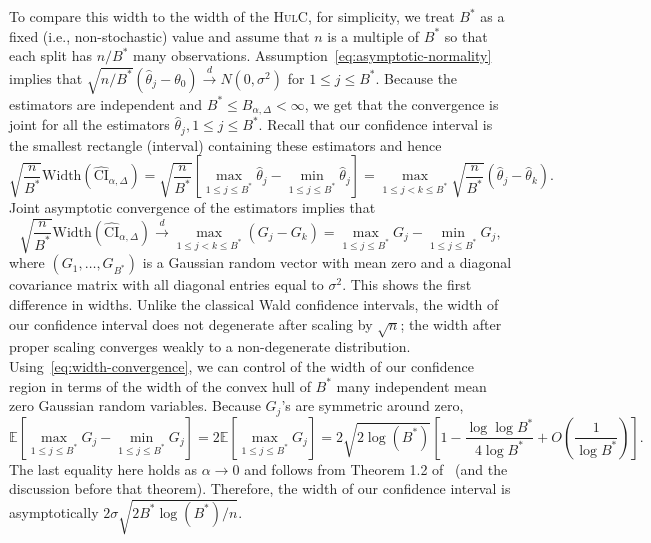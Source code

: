 \documentclass{article}
\newcommand{\hulcnospace}{\textsc{HulC}}
\numberwithin{myalgctr}{section}
\begin{document}
To compare this width to the width of the \hulcnospace, for simplicity, we treat $B^*$ as a fixed (i.e., non-stochastic) value and assume that $n$ is a multiple of $B^*$ so that each split has $n/B^*$ many observations. Assumption~\eqref{eq:asymptotic-normality} implies that
$\sqrt{{n}/{B^*}}(\widehat{\theta}_j - \theta_0) \overset{d}{\to} N(0, \sigma^2)$ for $1\le j\le B^*.$
Because the estimators are independent and $B^* \le B_{\alpha,\Delta} < \infty$, we get that the convergence is joint for all the estimators $\widehat{\theta}_j, 1\le j\le B^*$. Recall that our confidence interval is the smallest rectangle {\color{black}(interval)} containing these estimators and hence
\begin{equation}\label{eq:width-exact-equation}
\sqrt{\frac{n}{B^*}}\mbox{Width}(\widehat{\mathrm{CI}}_{\alpha,\Delta}) = \sqrt{\frac{n}{B^*}}\left[\max_{1\le j\le B^*}\widehat{\theta}_j - \min_{1\le j\le B^*}\widehat{\theta}_j\right] = \max_{1\le j < k\le B^*}\sqrt{\frac{n}{B^*}}(\widehat{\theta}_j - \widehat{\theta}_k).
\end{equation}
Joint asymptotic convergence of the estimators implies that
\begin{equation}\label{eq:width-convergence}
\sqrt{\frac{n}{B^*}}\mbox{Width}(\widehat{\mathrm{CI}}_{\alpha,\Delta}) \overset{d}{\to} \max_{1\le j < k \le B^*}(G_j - G_k) = \max_{1\le j\le B^*} G_j - \min_{1\le j\le B^*} G_j, 
\end{equation}
where $(G_1, \ldots, G_{B^*})$ is a Gaussian random vector with mean zero and a diagonal covariance matrix with all diagonal entries equal to $\sigma^2$. This shows the first difference in widths. Unlike the classical Wald confidence intervals, the width of our confidence interval does not degenerate after scaling by $\sqrt{n}$; the width after proper scaling converges weakly to a non-degenerate distribution. 
Using~\eqref{eq:width-convergence}, we can control of the width of our confidence region in terms of the width of the convex hull of $B^*$ many independent mean zero Gaussian random variables. Because $G_j$'s are symmetric around zero,
\[
\mathbb{E}\left[\max_{1\le j\le B^*}G_j - \min_{1\le j\le B^*}G_j\right] = 2\mathbb{E}\left[\max_{1\le j\le B^*}G_j\right] = 2\sqrt{2\log(B^*)}\left[1 - \frac{\log\log B^*}{4\log B^*} + O\left(\frac{1}{\log B^*}\right)\right].
\]
The last equality here holds as $\alpha\to0$ and follows from Theorem 1.2 of~\cite{kabluchko2019expected} (and the discussion before that theorem). Therefore, the width of our confidence interval is asymptotically
$2\sigma\sqrt{2B^*\log(B^*)/n}.$
\end{document}
